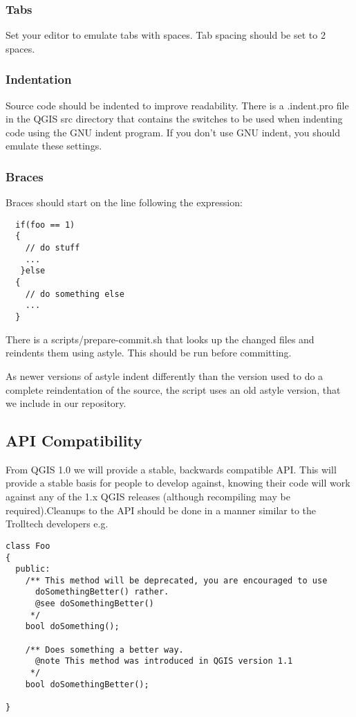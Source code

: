 \hypertarget{toc18}{}
\subsubsection{Tabs}
Set your editor to emulate tabs with spaces. Tab spacing should be set to 2
spaces.

\hypertarget{toc19}{}
\subsubsection{Indentation}
Source code should be indented to improve readability. There is a .indent.pro
file in the QGIS src directory that contains the switches to be used when
indenting code using the GNU indent program. If you don't use GNU indent, you
should emulate these settings.

\hypertarget{toc20}{}
\subsubsection{Braces}
Braces should start on the line following the expression:

\begin{verbatim}
  if(foo == 1)
  {
    // do stuff
    ...
   }else
  {
    // do something else
    ...
  }
\end{verbatim}

There is a scripts/prepare-commit.sh that looks up the changed files and
reindents them using astyle.  This should be run before committing.

As newer versions of astyle indent differently than the version used to do a
complete reindentation of the source, the script uses an old astyle version,
that we include in our repository.

\hypertarget{toc21}{}
\subsection{API Compatibility}
From QGIS 1.0 we will provide a stable, backwards compatible API. This will
provide a stable basis for people to develop against, knowing their code will
work against any of the 1.x QGIS releases (although recompiling may be
required).Cleanups to the API should be done in a manner similar to the
Trolltech developers e.g.

\begin{verbatim}
class Foo 
{
  public:
    /** This method will be deprecated, you are encouraged to use 
      doSomethingBetter() rather.
      @see doSomethingBetter()
     */
    bool doSomething();

    /** Does something a better way.
      @note This method was introduced in QGIS version 1.1
     */
    bool doSomethingBetter();

}
\end{verbatim}

